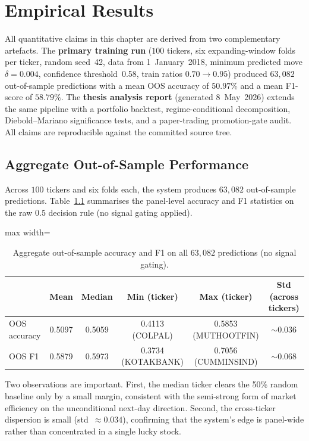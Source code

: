 \chapter{Empirical Results} \label{chapter4}

All quantitative claims in this chapter are derived from two complementary artefacts. The \textbf{primary training run} (\(100\) tickers, six expanding-window folds per ticker, random seed~42, data from 1~January~2018, minimum predicted move \(\delta=0.004\), confidence threshold~0.58, train ratios \(0.70\!\to\!0.95\)) produced \(63{,}082\) out-of-sample predictions with a mean OOS accuracy of \(50.97\%\) and a mean F1-score of \(58.79\%\). The \textbf{thesis analysis report} (generated 8~May~2026) extends the same pipeline with a portfolio backtest, regime-conditional decomposition, Diebold--Mariano significance tests, and a paper-trading promotion-gate audit. All claims are reproducible against the committed source tree.

\section{Aggregate Out-of-Sample Performance}

Across \(100\) tickers and six folds each, the system produces \(63{,}082\) out-of-sample predictions. Table~\ref{tab:aggregate_oos} summarises the panel-level accuracy and F1 statistics on the raw \(0.5\) decision rule (no signal gating applied).

\begin{table}[H]
\centering
\caption{Aggregate out-of-sample accuracy and F1 on all $63{,}082$ predictions (no signal gating).}
\label{tab:aggregate_oos}
\renewcommand{\arraystretch}{1.35}
\begin{adjustbox}{max width=\textwidth}
\begin{tabular}{l c c c c c}
\toprule
& \textbf{Mean} & \textbf{Median} & \textbf{Min (ticker)} & \textbf{Max (ticker)} & \textbf{Std (across tickers)} \\
\midrule
OOS accuracy   & 0.5097 & 0.5059 & 0.4113 (COLPAL)   & 0.5853 (MUTHOOTFIN)  & $\sim 0.036$ \\
OOS F1         & 0.5879 & 0.5973 & 0.3734 (KOTAKBANK) & 0.7056 (CUMMINSIND) & $\sim 0.068$ \\
\bottomrule
\end{tabular}
\end{adjustbox}
\end{table}

Two observations are important. First, the median ticker clears the 50\% random baseline only by a small margin, consistent with the semi-strong form of market efficiency on the unconditional next-day direction. Second, the cross-ticker dispersion is small (std~$\approx 0.034$), confirming that the system's edge is panel-wide rather than concentrated in a single lucky stock.

